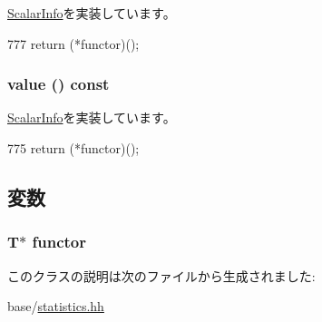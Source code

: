 \hyperlink{classStats_1_1ScalarInfo_ab152b7e89b37a7db03b04d500ceb8349}{ScalarInfo}を実装しています。


\begin{DoxyCode}
777 { return (*functor)(); }
\end{DoxyCode}
\hypertarget{classStats_1_1FunctorProxy_aa9e486cb7eb0ad44f5f89923594b68a4}{
\subsubsection[{value}]{ value () const}}
\label{classStats_1_1FunctorProxy_aa9e486cb7eb0ad44f5f89923594b68a4}


\hyperlink{classStats_1_1ScalarInfo_a1fb831559ad900460c4c9e4f546cd234}{ScalarInfo}を実装しています。


\begin{DoxyCode}
775 { return (*functor)(); }
\end{DoxyCode}


\subsection{変数}
\hypertarget{classStats_1_1FunctorProxy_ab920aaec834536b454099d92f08a5425}{
\subsubsection[{functor}]{\setlength{\rightskip}{0pt plus 5cm}T$\ast$ {\bf functor}}}
\label{classStats_1_1FunctorProxy_ab920aaec834536b454099d92f08a5425}


このクラスの説明は次のファイルから生成されました:\begin{DoxyCompactItemize}
\item 
base/\hyperlink{statistics_8hh}{statistics.hh}\end{DoxyCompactItemize}
